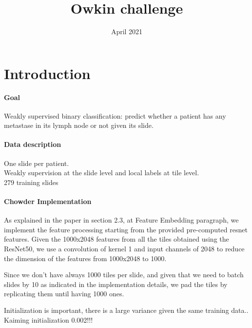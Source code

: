 \documentclass{article}
\title{Owkin challenge}
\author{ }
\date{April 2021}
\begin{document}
\maketitle

\section{Introduction}

\paragraph{Goal}
Weakly supervised binary classification: predict whether a patient has any metastase in its lymph node or not given its slide.

\paragraph{Data description}
One slide per patient. \\
Weakly supervision at the slide level and local labels at tile level.\\
279 training slides


\paragraph{Chowder Implementation}
As explained in the paper in section 2.3, at Feature Embedding paragraph, we implement the feature processing starting from the provided pre-computed resnet features. 
Given the 1000x2048 features from all the tiles obtained using the ResNet50, we use a convolution of kernel 1 and input channels of 2048 to reduce the dimension of the features from 1000x2048 to 1000.


Since we don't have always 1000 tiles per slide, and given that we need to batch slides by 10 as indicated in the implementation details, we pad the tiles by replicating them until having 1000 ones.


Initialization is important, there is a large variance given the same training data..
Kaiming initialization 0.002!!!



\end{document}
